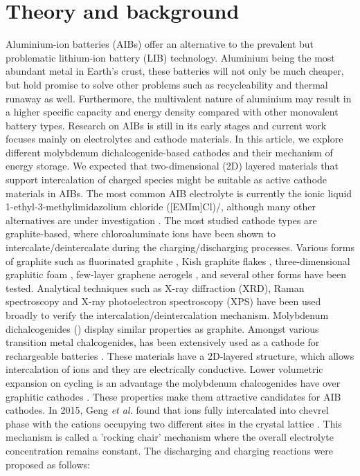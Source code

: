\section{Theory and background}
Aluminium-ion batteries (AIBs) offer an alternative to the prevalent but problematic lithium-ion battery (LIB) technology. Aluminium being the most abundant metal in Earth’s crust, these batteries will not only be much cheaper, but hold promise to solve other problems such as recycleability and thermal runaway as well. Furthermore, the multivalent nature of aluminium may result in a higher specific capacity and energy density compared with other monovalent battery types. Research on AIBs is still in its early stages and current work focuses mainly on electrolytes and cathode materials. In this article, we explore different molybdenum dichalcogenide-based cathodes and their mechanism of energy storage. We expected that two-dimensional (2D) layered materials that support intercalation of charged species might be suitable as active cathode materials in AIBs.
The most common AIB electrolyte is currently the ionic liquid 1-ethyl-3-methylimidazolium chloride ([EMIm]Cl)/, although many other alternatives are under investigation \cite{canever_acetamide_2018}. The most studied cathode types are graphite-based, where chloroaluminate ions  have been shown to intercalate/deintercalate during the charging/discharging processes. Various forms of graphite such as fluorinated graphite \cite{rani_fluorinated_2013}, Kish graphite flakes \cite{wang_kish_2017}, three-dimensional graphitic foam \cite{lin_ultrafast_2015-3}, few-layer graphene aerogels \cite{qiao_defect-free_2019}, and several other forms have been tested. Analytical techniques such as X-ray diffraction (XRD), Raman spectroscopy and X-ray photoelectron spectroscopy (XPS) have been used broadly to verify the intercalation/deintercalation mechanism. 
Molybdenum dichalcogenides () display similar properties as graphite. Amongst various transition metal chalcogenides,  has been extensively used as a cathode for rechargeable batteries \cite{li_rechargeable_2018-1, zhu_fast_2015}. These materials have a 2D-layered structure, which allows intercalation of ions and they are electrically conductive. Lower volumetric expansion on cycling is an advantage the molybdenum chalcogenides have over graphitic cathodes \cite{liang_rechargeable_2011,hu}. These properties make them attractive candidates for AIB cathodes. In 2015, Geng \textit{et al.} found that  ions fully intercalated into chevrel phase  with the cations occupying two different sites in the crystal lattice \cite{geng_reversible_2015}. This mechanism is called a 'rocking chair' mechanism where the overall electrolyte concentration remains constant. The discharging and charging reactions were proposed as follows:
